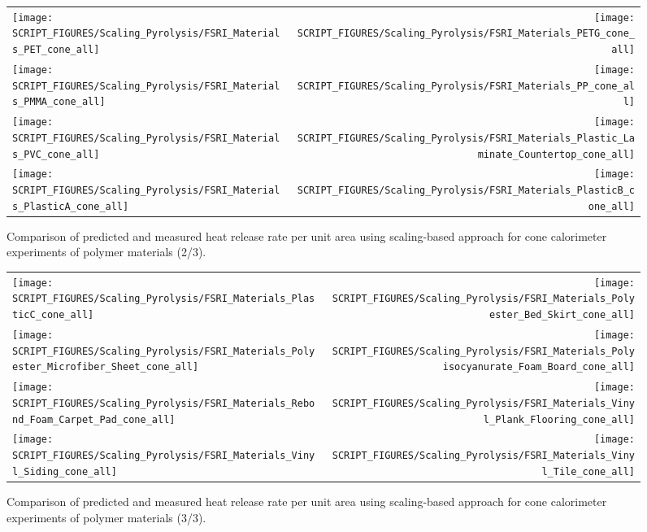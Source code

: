 \begin{figure}[p]
\begin{tabular*}{\textwidth}{l@{\extracolsep{\fill}}r}
\texttt{[image: SCRIPT\_FIGURES/Scaling\_Pyrolysis/FSRI\_Materials\_PET\_cone\_all]} &
\texttt{[image: SCRIPT\_FIGURES/Scaling\_Pyrolysis/FSRI\_Materials\_PETG\_cone\_all]} \\
\texttt{[image: SCRIPT\_FIGURES/Scaling\_Pyrolysis/FSRI\_Materials\_PMMA\_cone\_all]} &
\texttt{[image: SCRIPT\_FIGURES/Scaling\_Pyrolysis/FSRI\_Materials\_PP\_cone\_all]} \\
\texttt{[image: SCRIPT\_FIGURES/Scaling\_Pyrolysis/FSRI\_Materials\_PVC\_cone\_all]} &
\texttt{[image: SCRIPT\_FIGURES/Scaling\_Pyrolysis/FSRI\_Materials\_Plastic\_Laminate\_Countertop\_cone\_all]} \\
\texttt{[image: SCRIPT\_FIGURES/Scaling\_Pyrolysis/FSRI\_Materials\_PlasticA\_cone\_all]} &
\texttt{[image: SCRIPT\_FIGURES/Scaling\_Pyrolysis/FSRI\_Materials\_PlasticB\_cone\_all]} \\
\end{tabular*}
\caption[Heat release rate per unit area of FSRI materials using scaling model, polymer materials]
{Comparison of predicted and measured heat release rate per unit area using scaling-based approach for cone calorimeter experiments of polymer materials (2/3).}
\label{FSRI_Materials_polymers2}
\end{figure}

\begin{figure}[p]
\begin{tabular*}{\textwidth}{l@{\extracolsep{\fill}}r}
\texttt{[image: SCRIPT\_FIGURES/Scaling\_Pyrolysis/FSRI\_Materials\_PlasticC\_cone\_all]} &
\texttt{[image: SCRIPT\_FIGURES/Scaling\_Pyrolysis/FSRI\_Materials\_Polyester\_Bed\_Skirt\_cone\_all]} \\
\texttt{[image: SCRIPT\_FIGURES/Scaling\_Pyrolysis/FSRI\_Materials\_Polyester\_Microfiber\_Sheet\_cone\_all]} &
\texttt{[image: SCRIPT\_FIGURES/Scaling\_Pyrolysis/FSRI\_Materials\_Polyisocyanurate\_Foam\_Board\_cone\_all]} \\
\texttt{[image: SCRIPT\_FIGURES/Scaling\_Pyrolysis/FSRI\_Materials\_Rebond\_Foam\_Carpet\_Pad\_cone\_all]} &
\texttt{[image: SCRIPT\_FIGURES/Scaling\_Pyrolysis/FSRI\_Materials\_Vinyl\_Plank\_Flooring\_cone\_all]} \\
\texttt{[image: SCRIPT\_FIGURES/Scaling\_Pyrolysis/FSRI\_Materials\_Vinyl\_Siding\_cone\_all]} &
\texttt{[image: SCRIPT\_FIGURES/Scaling\_Pyrolysis/FSRI\_Materials\_Vinyl\_Tile\_cone\_all]} \\
\end{tabular*}
\caption[Heat release rate per unit area of FSRI materials using scaling model, polymer materials]
{Comparison of predicted and measured heat release rate per unit area using scaling-based approach for cone calorimeter experiments of polymer materials (3/3).}
\label{FSRI_Materials_polymers3}
\end{figure}


